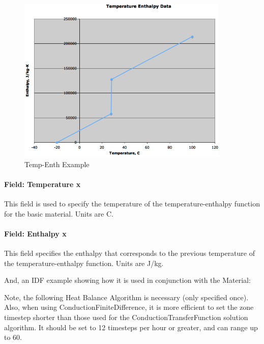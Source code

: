 \begin{figure}[htbp]
\centering
\includegraphics[width=0.9\textwidth, height=0.9\textheight, keepaspectratio=true]{media/image024.png}
\caption{Temp-Enth Example \protect \label{fig:temp-enth-example}}
\end{figure}

\paragraph{Field: Temperature x}\label{field-temperature-x}

This field is used to specify the temperature of the temperature-enthalpy function for the basic material. Units are C.

\paragraph{Field: Enthalpy x}\label{field-enthalpy-x}

This field specifies the enthalpy that corresponds to the previous temperature of the temperature-enthalpy function. Units are J/kg.

And, an IDF example showing how it is used in conjunction with the Material:

Note, the following Heat Balance Algorithm is necessary (only specified once). Also, when using ConductionFiniteDifference, it is more efficient to set the zone timestep shorter than those used for the ConductionTransferFunction solution algorithm. It should be set to 12 timesteps per hour or greater, and can range up to 60.

